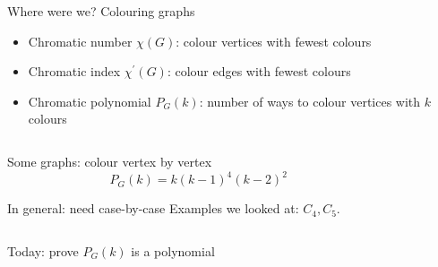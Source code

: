 \documentclass{beamer}
\begin{document}
\begin{frame}{Where were we? Colouring graphs}
\begin{itemize}
    \item Chromatic number $\chi(G)$: colour vertices with fewest colours
    \item Chromatic index $\chi^\prime(G)$: colour edges with fewest colours
    \item Chromatic polynomial $P_G(k)$: number of ways to colour vertices with $k$ colours
\end{itemize}


\begin{columns}
   \begin{column}{.6\textwidth}
 \begin{block}{Some graphs: colour vertex by vertex}
$$P_G(k)=k(k-1)^4(k-2)^2$$
\end{block}
\begin{block}{In general: need case-by-case}
Examples we looked at: $C_4, C_5$.
\end{block}
\end{column}
        
      \begin{column}{.4\textwidth}
        \end{column}  
    \end{columns}
\begin{block}{Today: prove $P_G(k)$ is a polynomial}
\end{block}
  \end{frame}
  
\end{document}
